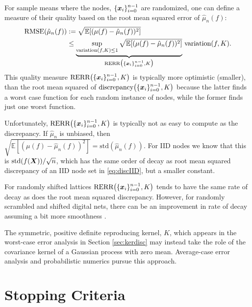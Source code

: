 \documentclass{svproc}
\begin{document}
For sample means where the nodes, $\{{\boldsymbol{x}}_i\}_{i=0}^{n-1}$ are randomized, one can define a measure of their quality based on the root mean squared error of $\hat{\mu}_n(f)$:
\begin{align}
    \text{RMSE}(\hat{\mu}_n(f)) & : = \sqrt{\mathbb{E}[(\mu(f) - \hat{\mu}_n(f))^2]} \\
    &\le \underbrace{ \sup_{\text{variation}(f,K) \le 1} \sqrt{\mathbb{E}[(\mu(f) - \hat{\mu}_n(f))^2]}}_{\text{RERR}\bigl(\{{\boldsymbol{x}}_i\}_{i=0}^{n-1},K\bigr)} \, \text{variation}(f,K).
\end{align}
This quality measure $\text{RERR}\bigl(\{{\boldsymbol{x}}_i\}_{i=0}^{n-1},K\bigr)$ is typically more optimistic (smaller), than the root mean squared of  $\text{discrepancy}\bigl(\{{\boldsymbol{x}}_i\}_{i=0}^{n-1},K\bigr)$ because the latter finds a worst case function for each random instance of nodes, while the former finds just one worst function.

Unfortunately, $\text{RERR}\bigl(\{{\boldsymbol{x}}_i\}_{i=0}^{n-1},K\bigr)$ is typically not as easy to compute as the discrepancy.  If $\hat{\mu}_n$ is unbiased, then $\sqrt{\mathbb{E}[(\mu(f) - \hat{\mu}_n(f))^2]} = \text{std}(\hat{\mu}_n(f))$.  For IID nodes we know that this is $\text{std}(f({\boldsymbol{X}}))/\sqrt{n}$, which has the same order of decay as root mean squared discrepancy of an IID node set in \eqref{eq:discIID}, but a smaller constant.

For randomly shifted lattices $\text{RERR}\bigl(\{{\boldsymbol{x}}_i\}_{i=0}^{n-1},K\bigr)$ tends to have the same rate of decay as does the root mean squared discrepancy.  However, for randomly scrambled and shifted digital nets, there can be an improvement in rate of decay assuming a bit more smoothness \cite{Owe97,HeiHicYue02a,HicYue00}.

The symmetric, positive definite reproducing kernel, $K$, which appears in the worst-case error analysis in Section \ref{sec:kerdisc} may instead take the role of the covariance kernel of a Gaussian process with zero mean.  Average-case error analysis \cite{Rit00a} and probabilistic numerics \cite{BriEtal18a} pursue this approach.



\section{Stopping Criteria} \label{sec:stop}

\end{document}
